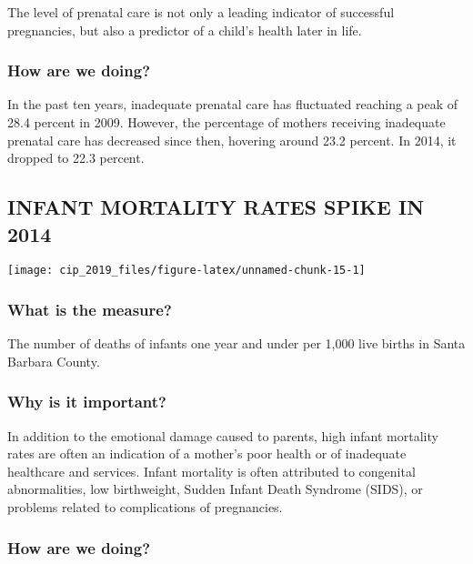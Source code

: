 \documentclass[]{book}
\theoremstyle{definition}
\theoremstyle{definition}
\theoremstyle{definition}
\theoremstyle{remark}
\begin{document}
The level of prenatal care is not only a leading indicator of successful
pregnancies, but also a predictor of a child's health later in life.

\subsubsection*{How are we doing?}\label{how-are-we-doing-8}

In the past ten years, inadequate prenatal care has fluctuated reaching
a peak of 28.4 percent in 2009. However, the percentage of mothers
receiving inadequate prenatal care has decreased since then, hovering
around 23.2 percent. In 2014, it dropped to 22.3 percent.

\subsection*{INFANT MORTALITY RATES SPIKE IN
2014}\label{infant-mortality-rates-spike-in-2014}

\texttt{[image: cip\_2019\_files/figure-latex/unnamed-chunk-15-1]}

\subsubsection*{What is the measure?}\label{what-is-the-measure-7}

The number of deaths of infants one year and under per 1,000 live births
in Santa Barbara County.

\subsubsection*{Why is it important?}\label{why-is-it-important-6}

In addition to the emotional damage caused to parents, high infant
mortality rates are often an indication of a mother's poor health or of
inadequate healthcare and services. Infant mortality is often attributed
to congenital abnormalities, low birthweight, Sudden Infant Death
Syndrome (SIDS), or problems related to complications of pregnancies.

\subsubsection*{How are we doing?}\label{how-are-we-doing-9}
\end{document}

